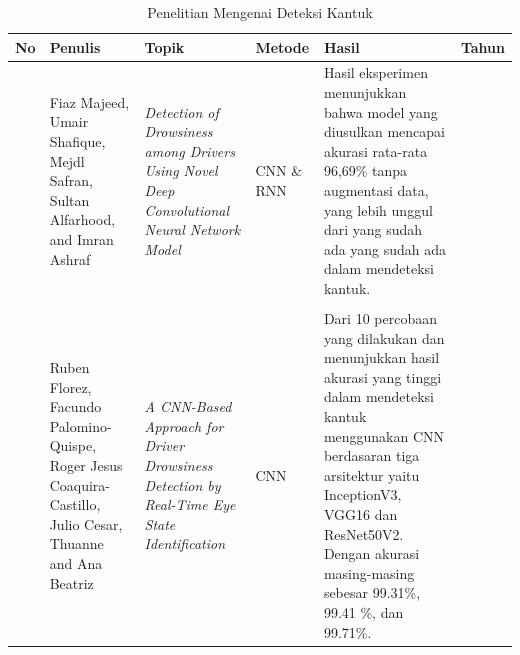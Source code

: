       \begin{table}[H]
        \centering
        \caption{Penelitian Mengenai Deteksi Kantuk}
         \label{Tabel Perbandingan Referensi}
        \begin{tabular}%
              {  >{\raggedright\arraybackslash}p{0.3cm} 
        >{\raggedright\arraybackslash}p{2.0cm} 
        >{\raggedright\arraybackslash}p{2.5cm} 
        >{\raggedright\arraybackslash}p{1.5cm} 
        >{\raggedright\arraybackslash}p{4.0cm} 
        >{\raggedright\arraybackslash}p{0.9cm}}
    
            \hline
            \textbf{No} & \textbf{Penulis} & \textbf{Topik} &\textbf{ Metode} & \textbf{Hasil} & \textbf{Tahun} \\
            
            \hline
             1 
            & 
            Fiaz Majeed, Umair Shafique, Mejdl Safran, Sultan Alfarhood, and Imran Ashraf
            &
            \textit{Detection of Drowsiness among Drivers Using Novel Deep Convolutional Neural Network Model}
            & 
            CNN \& RNN
            &
            Hasil eksperimen menunjukkan bahwa model yang diusulkan mencapai akurasi rata-rata 96,69\% tanpa augmentasi data, yang lebih unggul dari yang sudah ada yang sudah ada dalam mendeteksi kantuk.
            &
            2023 \\  
            \\

             2 
            & 
            Ruben Florez, Facundo Palomino-Quispe, Roger Jesus Coaquira-Castillo, Julio Cesar, Thuanne and Ana Beatriz
            & 
            \textit{A CNN-Based Approach for Driver Drowsiness Detection by Real-Time Eye State Identification}
            & 
            CNN
            &
            Dari 10 percobaan yang dilakukan dan menunjukkan hasil akurasi yang tinggi dalam mendeteksi kantuk menggunakan CNN berdasaran tiga arsitektur  yaitu InceptionV3, VGG16 dan ResNet50V2. Dengan akurasi masing-masing sebesar 99.31\%, 99.41 \%, dan 99.71\%. 
            &
            2023 \\
                \hline

        \end{tabular}
    \end{table}




